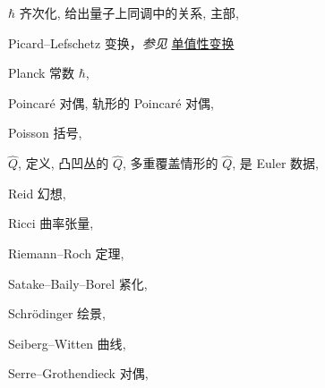 \begin{theindex}
\subitem \leavevmode\hypertarget{idx:1063}{$\hbar$ 齐次化},\enspace{}
\subitem \leavevmode\hypertarget{idx:1064}{给出量子上同调中的关系},\enspace{}
\subitem \leavevmode\hypertarget{idx:1065}{主部},\enspace{}
\indexspace
\item \leavevmode\hypertarget{idx:1066}{Picard--Lefschetz 变换}，\textit{参见} \hyperlink{idx:0901}{单值性变换}
\indexspace
\item \leavevmode\hypertarget{idx:1067}{Planck 常数 $\hbar$},\enspace{}
\indexspace
\item \leavevmode\hypertarget{idx:1068}{Poincaré 对偶},\enspace{}
\subitem \leavevmode\hypertarget{idx:1069}{轨形的 Poincaré 对偶},\enspace{}
\indexspace
\item \leavevmode\hypertarget{idx:1070}{Poisson 括号},\enspace{}
\indexspace
\item \leavevmode\hypertarget{idx:1101}{$\widehat Q$},\enspace{}
\subitem \leavevmode\hypertarget{idx:1102}{定义},\enspace{}
\subitem \leavevmode\hypertarget{idx:1103}{凸凹丛的 $\widehat Q$},\enspace{}
\subitem \leavevmode\hypertarget{idx:1104}{多重覆盖情形的 $\widehat Q$},\enspace{}
\subitem \leavevmode\hypertarget{idx:1105}{是 Euler 数据},\enspace{}
\indexspace
\item \leavevmode\hypertarget{source:490}{}\hypertarget{idx:1228}{Reid 幻想},\enspace{}
\indexspace
\item \leavevmode\hypertarget{idx:1232}{Ricci 曲率张量},\enspace{}
\indexspace
\item \leavevmode\hypertarget{idx:1233}{Riemann--Roch 定理},\enspace{}
\indexspace
\item \leavevmode\hypertarget{idx:1237}{Satake--Baily--Borel 紧化},\enspace{}
\indexspace
\item \leavevmode\hypertarget{idx:1238}{Schrödinger 绘景},\enspace{}
\indexspace
\item \leavevmode\hypertarget{idx:1243}{Seiberg--Witten 曲线},\enspace{}
\indexspace
\item \leavevmode\hypertarget{idx:1246}{Serre--Grothendieck 对偶},\enspace{}

\end{theindex}
